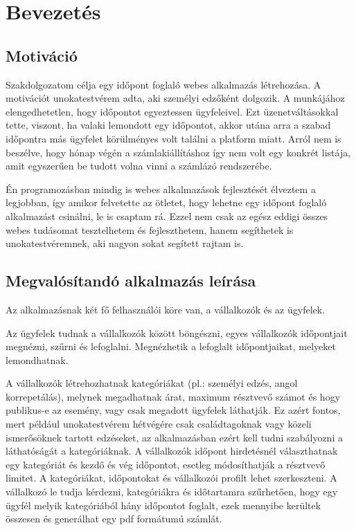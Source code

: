 \chapter{Bevezetés}
\label{ch:intro}

\section{Motiváció}
Szakdolgozatom célja egy időpont foglaló webes alkalmazás létrehozása. A motivációt unokatestvérem adta, aki személyi edzőként dolgozik. A munkájához elengedhetetlen, hogy időpontot egyeztessen ügyfeleivel. Ezt üzenetváltásokkal tette, viszont, ha valaki lemondott egy időpontot, akkor utána arra a szabad időpontra más ügyfelet körülményes volt találni a platform miatt. Arról nem is beszélve, hogy hónap végén a számlakiállításhoz így nem volt egy konkrét listája, amit egyszerűen be tudott volna vinni a számlázó rendszerébe.

Én programozásban mindig is webes alkalmazások fejlesztését élveztem a legjobban, így amikor felvetette az ötletet, hogy lehetne egy időpont foglaló alkalmazást csinálni, le is csaptam rá. Ezzel nem csak az egész eddigi összes webes tudásomat tesztelhetem és fejleszthetem, hanem segíthetek is unokatestvéremnek, aki nagyon sokat segített rajtam is.

\section{Megvalósítandó alkalmazás leírása}
Az alkalmazásnak két fő felhasználói köre van, a vállalkozók és az ügyfelek.

Az ügyfelek tudnak a vállalkozók között böngészni, egyes vállalkozók időpontjait megnézni, szűrni és lefoglalni. Megnézhetik a lefoglalt időpontjaikat, melyeket lemondhatnak.

A vállalkozók létrehozhatnak kategóriákat (pl.: személyi edzés, angol korrepetálás), melynek megadhatnak árat, maximum résztvevő számot és hogy publikus-e az esemény, vagy csak megadott ügyfelek láthatják. Ez azért fontos, mert például unokatestvérem hétvégére csak családtagoknak vagy közeli ismerősöknek tartott edzéseket, az alkalmazásban ezért kell tudni szabályozni a láthatóságát a kategóriáknak. A vállalkozók időpont hirdetésnél választhatnak egy kategóriát és kezdő és vég időpontot, esetleg módosíthatják a résztvevő limitet. A kategóriákat, időpontokat és vállalkozói profilt lehet szerkeszteni. A vállalkozó le tudja kérdezni, kategóriákra és időtartamra szűrhetően, hogy egy ügyfél melyik kategóriából hány időpontot foglalt, ezek mennyibe kerültek összesen és generálhat egy pdf formátumú számlát.

